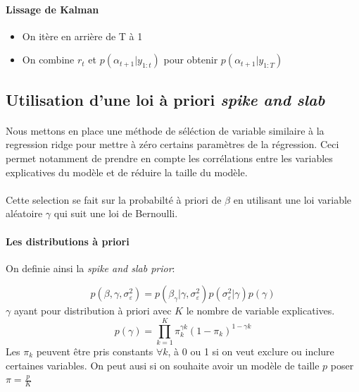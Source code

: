 \documentclass{article}
\theoremstyle{definition}
\theoremstyle{remark}
\begin{document}
{\paragraph{Lissage de Kalman}
\begin{itemize}
    \item On itère en arrière de T à 1
    \item On combine $r_t$ et $p\left(\alpha_{t+1} | y_{1: t}\right)$ pour obtenir $p\left(\alpha_{t+1} | y_{1: T}\right)$
\end{itemize}


\subsection{Utilisation d'une loi à priori \textit{spike and slab}}
\paragraph{}
Nous mettons en place une méthode de séléction de variable similaire à la regression ridge pour \og{} mettre à zéro \fg{}  certains paramètres de la régression. Ceci permet notamment 
de prendre en compte les corrélations entre les variables explicatives du modèle et de réduire la taille du modèle.

\paragraph{}
Cette selection se fait sur la probabilté à priori de $\beta$ en utilisant une loi 
variable aléatoire $\gamma$ qui suit une loi de Bernoulli. \\

\paragraph{Les distributions à priori \\}
On definie ainsi la \textit{spike and slab prior}:

\begin{equation}
	p\left(\beta, \gamma, \sigma_{\varepsilon}^{2}\right)=p\left(\beta_{\gamma} | \gamma, \sigma_{\varepsilon}^{2}\right) p\left(\sigma_{\varepsilon}^{2} | \gamma\right) p(\gamma)
\end{equation}
$\gamma$ ayant pour distribution à priori avec $K$ le nombre de variable explicatives.
\begin{equation}
	p(\gamma)=\prod_{k=1}^{K} \pi_k^{\gamma k}(1-\pi_k)^{1-\gamma k}
\end{equation}
Les $\pi_k$ peuvent être pris constants $ \forall k$, à 0 ou 1 si on veut exclure ou inclure certaines variables. On peut ausi
si on souhaite avoir un modèle de taille $p$ poser $\pi = \frac{p}{K}$

}
\end{document}
